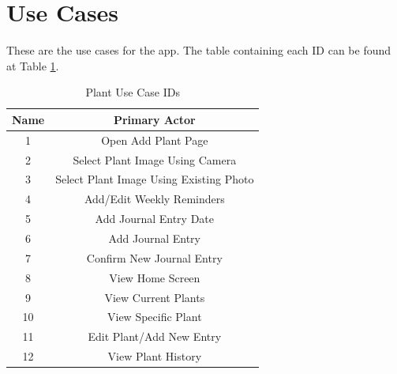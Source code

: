 \documentclass{sigchi}
\begin{document}
\section{Use Cases}
These are the use cases for the app. The table containing each ID can be found at Table \ref{tab:use_cases}.
\begin{table}[]
    \centering
    \begin{tabular}{|c|c|}
        \hline
         Name & Primary Actor \\
         \hline
         \hline
         1 & Open Add Plant Page\\
         \hline
         2 & Select Plant Image Using Camera \\
         \hline
         3 & Select Plant Image Using Existing Photo \\
         \hline
         4 & Add/Edit Weekly Reminders \\
         \hline
         5 & Add Journal Entry Date \\
         \hline
         6 & Add Journal Entry \\
         \hline
         7 & Confirm New Journal Entry \\
         \hline
         8 & View Home Screen \\
         \hline
         9 & View Current Plants \\
         \hline
         10 & View Specific Plant \\
         \hline
         11 & Edit Plant/Add New Entry \\
         \hline
         12 & View Plant History \\
         \hline
    \end{tabular}
    \caption{Plant Use Case IDs}
    \label{tab:use_cases}
\end{table}


\end{document}
